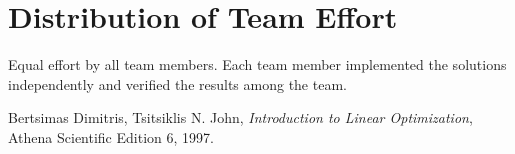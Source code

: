 \documentclass[twoside,12pt]{article}
\begin{document}
\section{Distribution of Team Effort}
Equal effort by all team members. Each team member implemented the solutions independently and verified the results among the team.





\begin{thebibliography}{9}

  Bertsimas Dimitris, Tsitsiklis N. John,
  \emph{Introduction to Linear Optimization},
  Athena Scientific Edition 6,
  1997.

\end{thebibliography}
\end{document}
